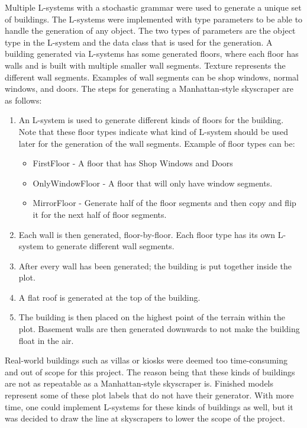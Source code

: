 Multiple L-systems with a stochastic grammar were used to generate a unique set of buildings. 
The L-systems were implemented with type parameters to be able to handle the generation of any object.
The two types of parameters are the object type in the L-system and the data class that is used for the generation.
A building generated via L-systems has some generated floors, where each floor has walls and is built with multiple smaller wall segments. 
Texture represents the different wall segments.
Examples of wall segments can be shop windows, normal windows, and doors.
The steps for generating a Manhattan-style skyscraper are as follows:
\begin{enumerate}
    \item An L-system is used to generate different kinds of floors for the building. Note that these floor types indicate what kind of L-system should be used later for the generation of the wall segments. Example of floor types can be:
    \begin{itemize}
        \item FirstFloor - A floor that has Shop Windows and Doors
        \item OnlyWindowFloor - A floor that will only have window segments. 
        \item MirrorFloor - Generate half of the floor segments and then copy and flip it for the next half of floor segments.
    \end{itemize}
    \item Each wall is then generated, floor-by-floor. Each floor type has its own L-system to generate different wall segments.
    \item After every wall has been generated; the building is put together inside the plot.
    \item A flat roof is generated at the top of the building.
    \item The building is then placed on the highest point of the terrain within the plot. Basement walls are then generated downwards to not make the building float in the air. %
\end{enumerate}



Real-world buildings such as villas or kiosks were deemed too time-consuming and out of scope for this project.
The reason being that these kinds of buildings are not as repeatable as a Manhattan-style skyscraper is. 
Finished models represent some of these plot labels that do not have their generator.
With more time, one could implement L-systems for these kinds of buildings as well, but it was decided to draw the line at skyscrapers to lower the scope of the project.
